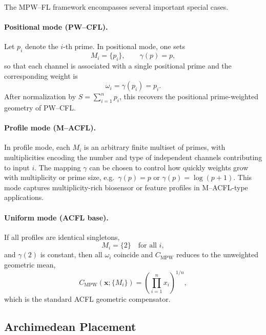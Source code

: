 \documentclass[11pt]{article}
\begin{document}
The MPW--FL framework encompasses several important special cases.

\paragraph{Positional mode (PW--CFL).}
Let $p_i$ denote the $i$-th prime. In positional mode, one sets
\[
  M_i = \{p_i\}, \qquad \gamma(p) = p,
\]
so that each channel is associated with a single positional prime and the corresponding weight is
\[
  \omega_i = \gamma(p_i) = p_i.
\]
After normalization by $S = \sum_{i=1}^n p_i$, this recovers the positional prime-weighted geometry of PW--CFL.

\paragraph{Profile mode (M--ACFL).}
In profile mode, each $M_i$ is an arbitrary finite multiset of primes, with multiplicities encoding the number and type of independent channels contributing to input $i$. The mapping $\gamma$ can be chosen to control how quickly weights grow with multiplicity or prime size, e.g.\ $\gamma(p) = p$ or $\gamma(p) = \log(p+1)$. This mode captures multiplicity-rich biosensor or feature profiles in M--ACFL-type applications.

\paragraph{Uniform mode (ACFL base).}
If all profiles are identical singletons,
\[
  M_i = \{2\} \quad \text{for all } i,
\]
and $\gamma(2)$ is constant, then all $\omega_i$ coincide and $C_{\mathrm{MPW}}$ reduces to the unweighted geometric mean,
\[
  C_{\mathrm{MPW}}(\mathbf{x};\{M_i\}) = \left(\prod_{i=1}^n x_i\right)^{1/n},
\]
which is the standard ACFL geometric compensator.

\subsection{Archimedean Placement}
\label{subsec:archimedean-placement}
\end{document}

